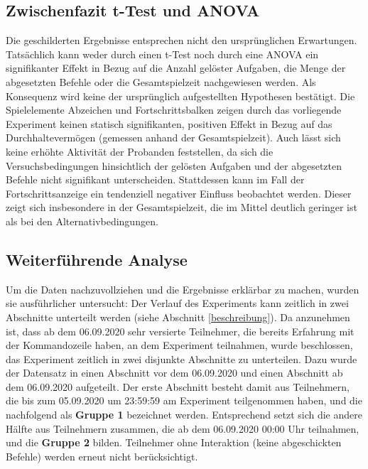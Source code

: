 
\subsection{Zwischenfazit t-Test und ANOVA}
Die geschilderten Ergebnisse entsprechen nicht den ursprünglichen Erwartungen. Tatsächlich kann weder durch einen t-Test noch durch eine ANOVA ein signifikanter Effekt in Bezug auf die Anzahl gelöster Aufgaben, die Menge der abgesetzten Befehle oder die Gesamtspielzeit nachgewiesen werden. Als Konsequenz wird keine der ursprünglich aufgestellten Hypothesen bestätigt. Die Spielelemente Abzeichen und Fortschrittsbalken zeigen durch das vorliegende Experiment keinen statisch signifikanten, positiven Effekt in Bezug auf das Durchhaltevermögen (gemessen anhand der Gesamtspielzeit). Auch lässt sich keine erhöhte Aktivität der Probanden feststellen, da sich die Versuchsbedingungen hinsichtlich der gelösten Aufgaben und der abgesetzten Befehle nicht signifikant unterscheiden. Stattdessen kann im Fall der Fortschrittsanzeige ein tendenziell negativer Einfluss beobachtet werden. Dieser zeigt sich insbesondere in der Gesamtspielzeit, die im Mittel deutlich geringer ist als bei den Alternativbedingungen. 

\subsection{Weiterführende Analyse}
Um die Daten nachzuvollziehen und die Ergebnisse erklärbar zu machen, wurden sie ausführlicher untersucht: Der Verlauf des Experiments kann zeitlich in zwei Abschnitte unterteilt werden (siehe Abschnitt \ref{beschreibung}). Da anzunehmen ist, dass ab dem 06.09.2020 sehr versierte Teilnehmer, die bereits Erfahrung mit der Kommandozeile haben, an dem Experiment teilnahmen, wurde beschlossen, das Experiment zeitlich in zwei disjunkte Abschnitte zu unterteilen. Dazu wurde der Datensatz in einen Abschnitt vor dem 06.09.2020 und einen Abschnitt ab dem 06.09.2020 aufgeteilt. Der erste Abschnitt besteht damit aus Teilnehmern, die bis zum 05.09.2020 um 23:59:59 am Experiment teilgenommen haben, und die nachfolgend als \textbf{Gruppe 1} bezeichnet werden. Entsprechend setzt sich die andere Hälfte aus Teilnehmern zusammen, die ab dem 06.09.2020 00:00 Uhr teilnahmen, und die \textbf{Gruppe 2} bilden. Teilnehmer ohne Interaktion (keine abgeschickten Befehle) werden erneut nicht berücksichtigt.

